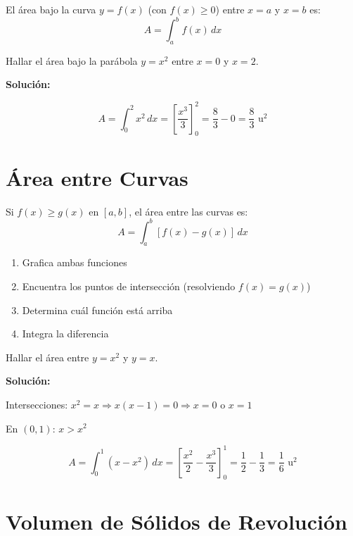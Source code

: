 \documentclass[12pt, a4paper]{book}
\begin{document}
\begin{definicion}
El área bajo la curva $y = f(x)$ (con $f(x) \geq 0$) entre $x = a$ y $x = b$ es:
\[
A = \int_a^b f(x) \, dx
\]
\end{definicion}

\begin{ejemplo}
Hallar el área bajo la parábola $y = x^2$ entre $x = 0$ y $x = 2$.

\textbf{Solución:}

\[
A = \int_0^2 x^2 \, dx = \left[\frac{x^3}{3}\right]_0^2 = \frac{8}{3} - 0 = \frac{8}{3} \text{ u}^2
\]
\end{ejemplo}

\section{Área entre Curvas}

\begin{definicion}
Si $f(x) \geq g(x)$ en $[a,b]$, el área entre las curvas es:
\[
A = \int_a^b [f(x) - g(x)] \, dx
\]
\end{definicion}

\begin{algoritmo}
\begin{enumerate}
    \item Grafica ambas funciones
    \item Encuentra los puntos de intersección (resolviendo $f(x) = g(x)$)
    \item Determina cuál función está arriba
    \item Integra la diferencia
\end{enumerate}
\end{algoritmo}

\begin{ejemplo}
Hallar el área entre $y = x^2$ y $y = x$.

\textbf{Solución:}

Intersecciones: $x^2 = x \Rightarrow x(x-1) = 0 \Rightarrow x = 0 \text{ o } x = 1$

En $(0,1)$: $x > x^2$

\[
A = \int_0^1 (x - x^2) \, dx = \left[\frac{x^2}{2} - \frac{x^3}{3}\right]_0^1 = \frac{1}{2} - \frac{1}{3} = \frac{1}{6} \text{ u}^2
\]
\end{ejemplo}

\section{Volumen de Sólidos de Revolución}
\end{document}

